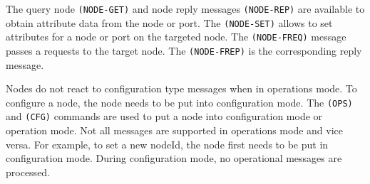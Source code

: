 The query node \texttt{(NODE-GET)} and node reply messages \texttt{(NODE-REP)} are available to obtain attribute data from the node or port. The \texttt{(NODE-SET)} allows to set attributes for a node or port on the targeted node. The \texttt{(NODE-FREQ)} message passes a requests to the target node. The \texttt{(NODE-FREP)} is the corresponding reply message.
\begin{table}[ht!]
    \centering 
\end{table}

Nodes do not react to configuration type messages when in operations mode. To configure a node, the node needs to be put into configuration mode. The \texttt{(OPS)} and \texttt{(CFG)} commands are used to put a node into configuration mode or operation mode. Not all messages are supported in operations mode and vice versa. For example, to set a new nodeId, the node first needs to be put in configuration mode. During configuration mode, no operational messages are processed.

\begin{table}[ht!]
    \centering 
\end{table}

